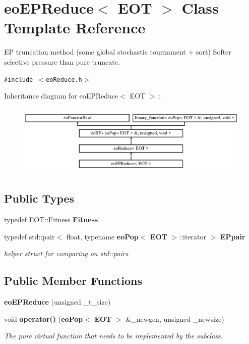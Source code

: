 \section{eo\-EPReduce$<$ EOT $>$ Class Template Reference}
\label{classeo_e_p_reduce}
EP truncation method (some global stochastic tournament + sort) Softer selective pressure than pure truncate.  


{\tt \#include $<$eo\-Reduce.h$>$}

Inheritance diagram for eo\-EPReduce$<$ EOT $>$::\begin{figure}[H]
\begin{center}
\leavevmode
\includegraphics[height=3.45679cm]{classeo_e_p_reduce}
\end{center}
\end{figure}
\subsection*{Public Types}
\begin{CompactItemize}
\item 
typedef EOT::Fitness {\bf Fitness}\label{classeo_e_p_reduce_w0}

\item 
typedef std::pair$<$ float, typename {\bf eo\-Pop}$<$ {\bf EOT} $>$::iterator $>$ {\bf EPpair}\label{classeo_e_p_reduce_w1}

\begin{CompactList}\small\item\em helper struct for comparing on std::pairs \item\end{CompactList}\end{CompactItemize}
\subsection*{Public Member Functions}
\begin{CompactItemize}
\item 
{\bf eo\-EPReduce} (unsigned \_\-t\_\-size)\label{classeo_e_p_reduce_a0}

\item 
void {\bf operator()} ({\bf eo\-Pop}$<$ {\bf EOT} $>$ \&\_\-newgen, unsigned \_\-newsize)\label{classeo_e_p_reduce_a1}

\begin{CompactList}\small\item\em The pure virtual function that needs to be implemented by the subclass. \item\end{CompactList}\end{CompactItemize}
